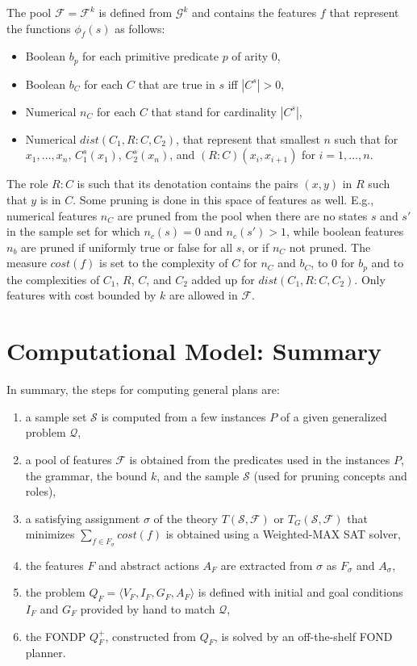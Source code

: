 \documentclass[letterpaper]{article} %
\newcommand{\tup}[1]{\langle #1 \rangle}
\newcommand{\Q}{\mathcal{Q}}
\newcommand{\F}{\mathcal{F}}
\renewcommand{\S}{\mathcal{S}}
\newcommand{\G}{\mathcal{G}}
\begin{document}
The pool $\F=\F^k$  is defined from $\G^k$ and contains
the  features $f$ that represent the functions $\phi_f(s)$ as follows:
\begin{itemize}
\item Boolean $b_p$ for each primitive predicate $p$ of arity $0$,
\item Boolean $b_C$ for each $C$ that are true in $s$ iff $|C^s| > 0$,
\item Numerical $n_C$ for each $C$ that stand for cardinality $|C^s|$,
\item Numerical $\textit{dist}(C_1,R:C,C_2)$, that represent that smallest
  $n$ such that for $x_1, \ldots, x_n$, $C_1^s(x_1)$, $C_2^s(x_{n})$, and
  $(R:C)(x_i,x_{i+1})$ for $i=1, \ldots, n$. 
\end{itemize}  

The role $R:C$ is such that its denotation contains the pairs $(x,y)$ in $R$
such that $y$ is in $C$.
Some pruning is done in this space of features as well. E.g., numerical
features $n_C$ are pruned from the pool when there are no states $s$ and $s'$
in the sample set for which $n_c(s)=0$ and $n_c(s') > 1$, while boolean
features $n_b$ are pruned if uniformly true or false for all $s$, or if $n_C$
not pruned. 
The measure $cost(f)$ is set to the complexity of $C$ for $n_C$ and $b_C$,
to $0$ for $b_p$ and to the complexities of $C_1$, $R$, $C$, and $C_2$ added
up for $\textit{dist}(C_1,R:C,C_2)$.
Only features with cost bounded by $k$ are allowed in $\F$.


\section{Computational Model: Summary}

In summary, the steps for computing general plans are:
\begin{enumerate}
  \item a sample set $\S$ is computed from a few instances $P$ of a given
    generalized problem $\Q$,
  \item a pool of features $\F$ is obtained from the predicates used in the
    instances $P$, the grammar, the bound $k$, and the sample $\S$ (used for
    pruning concepts and roles),
  \item a satisfying assignment $\sigma$ of the theory $T(\S,\F)$ or $T_G(\S,\F)$
    that minimizes $\sum_{f \in F_{\sigma}} cost(f)$ is obtained using a
    Weighted-MAX SAT solver,
  \item the features $F$ and abstract actions $A_F$ are extracted from $\sigma$
    as $F_{\sigma}$ and $A_{\sigma}$,
  \item the problem $Q_F=\tup{V_F,I_F,G_F,A_F}$ is defined with initial and goal
    conditions $I_F$ and $G_F$ provided by hand to match $\Q$, 
  \item the FONDP $Q^+_F$, constructed from $Q_F$, is solved by an off-the-shelf
    FOND planner.
\end{enumerate}
\end{document}

